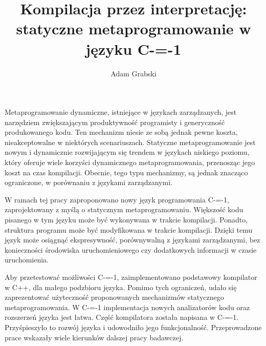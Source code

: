 \documentclass[
    left=2.5cm,         %
    right=2.5cm,        %
    top=2.5cm,          %
    bottom=3cm,         %
    bindingoffset=6mm,  %
    nohyphenation=false %
]{eiti/eiti-thesis}
\begin{document}
\MasterThesis %
{}
\title{
Kompilacja przez interpretację:\\
statyczne metaprogramowanie w języku C-=-1
}
\author{Adam Grabski}
\date{\the\year}
\maketitle

\cleardoublepage %
\streszczenie 
Metaprogramowanie dynamiczne, istniejące w językach zarządzanych, jest narzędziem zwiększającym produktywność programisty i generyczność produkowanego kodu.
Ten mechanizm niesie ze sobą jednak pewne koszta, nieakceptowalne w niektórych scenariuszach.
Statyczne metaprogramowanie jest nowym i dynamicznie rozwijającym się trendem w językach niskiego poziomu, który oferuje wiele korzyści dynamicznego metaprogramowania, przenosząc jego koszt na czas kompilacji.
Obecnie, tego typu mechanizmy, są jednak znacząco ograniczone, w porównaniu z językami zarządzanymi.

W ramach tej pracy zaproponowano nowy język programowania C-=-1, zaprojektowany z myślą o statycznym metaprogramowaniu.
Większość kodu pisanego w tym języku może być wykonywana w trakcie kompilacji.
Ponadto, struktura programu może być modyfikowana w trakcie kompilacji.
Dzięki temu język może osiągnąć ekspresywność, porównywalną z językami zarządzanymi, bez konieczności środowiska uruchomieniowego czy dodatkowych informacji w czasie uruchomienia.

Aby przetestować możliwości C-=-1, zaimplementowano podstawowy kompilator w C++, dla małego podzbioru języka.
Pomimo tych ograniczeń, udało się zaprezentować użyteczność proponowanych mechanizmów statycznego metaprogramowania.
W C-=-1 implementacja nowych analizatorów kodu oraz rozszerzeń języka jest łatwa.
Część kompilatora została napisana w C-=-1.
Przyśpieszyło to rozwój języka i udowodniło jego funkcjonalność.
Przeprowadzone prace wskazały wiele kierunków dalszej pracy badawczej.
\end{document}
